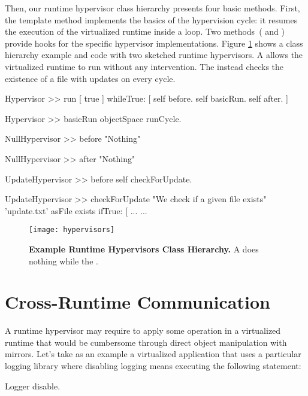 Then, our runtime hypervisor class hierarchy presents four basic methods. First, the  template method implements the basics of the hypervision cycle: it resumes the execution of the virtualized runtime inside a loop. Two methods~( and ) provide hooks for the specific hypervisor implementations. Figure \ref{fig:hypervisors} shows a class hierarchy example and code with two sketched runtime hypervisors. A  allows the virtualized runtime to run without any intervention. The  instead checks the existence of a file with updates on every cycle.

\begin{code}
Hypervisor >> run
    [ true ] whileTrue: [
        self before.
        self basicRun.
        self after.
    ]

Hypervisor >> basicRun
    objectSpace runCycle.

NullHypervisor >> before
    "Nothing"

NullHypervisor >> after
    "Nothing"

UpdateHypervisor >> before
    self checkForUpdate.

UpdateHypervisor >> checkForUpdate
    "We check if a given file exists"
    'update.txt' asFile exists ifTrue: [ ...
    ...
\end{code}

\begin{figure}[ht]
\center
\texttt{[image: hypervisors]}
\caption{\textbf{Example Runtime Hypervisors Class Hierarchy.} A  does nothing while the .\label{fig:hypervisors}}
\end{figure}

\section{Cross-Runtime Communication} \label{sec:communication}\label{sec:isolation}

A runtime hypervisor may require to apply some operation in a virtualized runtime that would be cumbersome through direct object manipulation with mirrors. Let's take as an example a virtualized application that uses a particular logging library where disabling logging means executing the following statement:

\begin{code}
Logger disable.
\end{code}

